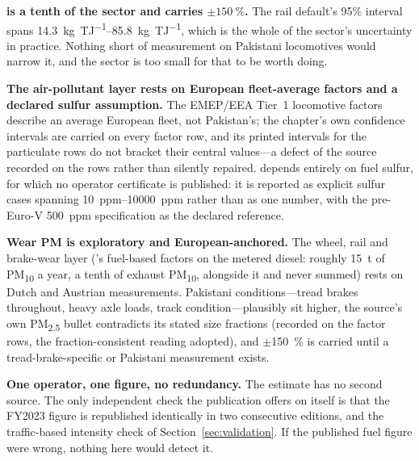 \textbf{\NtwoO{} is a tenth of the sector and carries $\pm\SI{150}{\percent}$.} The rail
default's 95\% interval spans \SIrange{14.3}{85.8}{\kilo\gram\per\tera\joule}, which is the
whole of the sector's uncertainty in practice. Nothing short of measurement on Pakistani
locomotives would narrow it, and the sector is too small for that to be worth doing.

\textbf{The air-pollutant layer rests on European fleet-average factors and a declared
sulfur assumption.} The EMEP/EEA Tier~1 locomotive factors describe an average European
fleet, not Pakistan's; the chapter's own confidence intervals are carried on every factor
row, and its printed intervals for the particulate rows do not bracket their central
values---a defect of the source recorded on the rows rather than silently repaired. \SOtwo{}
depends entirely on fuel sulfur, for which no operator certificate is published: it is
reported as explicit sulfur cases spanning \SIrange{10}{10000}{ppm} rather than as one
number, with the pre-Euro-V \SI{500}{ppm} specification as the declared reference.

\textbf{Wear PM is exploratory and European-anchored.} The wheel, rail and brake-wear
layer (\citet{tno2024rail}'s fuel-based factors on the metered diesel: roughly
\SI{15}{\tonne} of PM\textsubscript{10} a year, a tenth of exhaust PM\textsubscript{10},
alongside it and never summed) rests on Dutch and Austrian measurements. Pakistani
conditions---tread brakes throughout, heavy axle loads, track condition---plausibly sit
higher, the source's own PM\textsubscript{2.5} bullet contradicts its stated size
fractions (recorded on the factor rows, the fraction-consistent reading adopted), and
$\pm$\SI{150}{\percent} is carried until a tread-brake-specific or Pakistani measurement
exists.

\textbf{One operator, one figure, no redundancy.} The estimate has no second source. The only
independent check the publication offers on itself is that the FY2023 figure is republished
identically in two consecutive editions, and the traffic-based intensity check of
Section~\ref{sec:validation}. If the published fuel figure were wrong, nothing here would
detect it.
